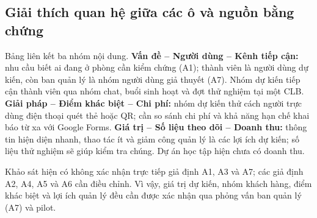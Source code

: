 \subsection{Giải thích quan hệ giữa các ô và nguồn bằng chứng}
Bảng liên kết ba nhóm nội dung. \textbf{Vấn đề -- Người dùng -- Kênh tiếp cận:} nhu cầu biết ai đang ở phòng cần kiểm chứng (A1); thành viên là người dùng dự kiến, còn ban quản lý là nhóm người dùng giả thuyết (A7). Nhóm dự kiến tiếp cận thành viên qua nhóm chat, buổi sinh hoạt và đợt thử nghiệm tại một CLB. \textbf{Giải pháp -- Điểm khác biệt -- Chi phí:} nhóm dự kiến thử cách người trực dùng điện thoại quét thẻ hoặc QR; cần so sánh chi phí và khả năng hạn chế khai báo từ xa với Google Forms. \textbf{Giá trị -- Số liệu theo dõi -- Doanh thu:} thông tin hiện diện nhanh, thao tác ít và giảm công quản lý là các lợi ích dự kiến; số liệu thử nghiệm sẽ giúp kiểm tra chúng. Dự án học tập hiện chưa có doanh thu.

Khảo sát hiện có không xác nhận trực tiếp giả định A1, A3 và A7; các giả định A2, A4, A5 và A6 cần điều chỉnh. Vì vậy, giá trị dự kiến, nhóm khách hàng, điểm khác biệt và lợi ích quản lý đều cần được xác nhận qua phỏng vấn ban quản lý (A7) và pilot.
